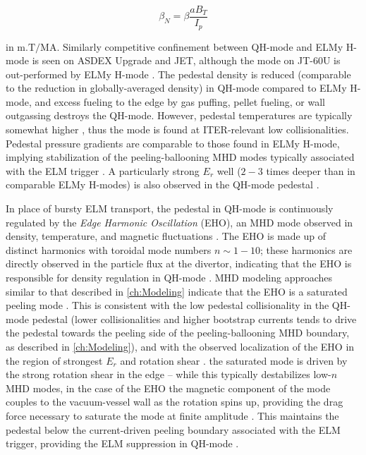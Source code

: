\begin{equation}\label{eq:betan}
 \beta_N = \beta \frac{aB_T}{I_p}
\end{equation}

\noindent in $\si{\meter.\tesla\per\mega\ampere}$.  Similarly competitive confinement between QH-mode and ELMy H-mode is seen on ASDEX Upgrade and JET, although the mode on JT-60U is out-performed by ELMy H-mode \cite{Oyama2006}.  The pedestal density is reduced (comparable to the reduction in globally-averaged density) in QH-mode compared to ELMy H-mode, and excess fueling to the edge by gas puffing, pellet fueling, or wall outgassing destroys the QH-mode.  However, pedestal temperatures are typically somewhat higher \cite{Doyle2001}, thus the mode is found at ITER-relevant low collisionalities.  Pedestal pressure gradients are comparable to those found in ELMy H-mode, implying stabilization of the peeling-ballooning MHD modes typically associated with the ELM trigger \cite{Burrell2002}.  A particularly strong $E_r$ well ($2-3$ times deeper than in comparable ELMy H-modes) is also observed in the QH-mode pedestal \cite{Greenfield2002}.

In place of bursty ELM transport, the pedestal in QH-mode is continuously regulated by the \emph{Edge Harmonic Oscillation} (EHO), an MHD mode observed in density, temperature, and magnetic fluctuations \cite{Burrell2002}.  The EHO is made up of distinct harmonics with toroidal mode numbers $n \sim 1-10$; these harmonics are directly observed in the particle flux at the divertor, indicating that the EHO is responsible for density regulation in QH-mode \cite{Doyle2001}.  MHD modeling approaches similar to that described in \cref{ch:Modeling} indicate that the EHO is a saturated peeling mode \cite{Snyder2007,Osborne2008,Snyder2012}.  This is consistent with the low pedestal collisionality in the QH-mode pedestal (lower collisionalities and higher bootstrap currents tends to drive the pedestal towards the peeling side of the peeling-ballooning MHD boundary, as described in \cref{ch:Modeling}), and with the observed localization of the EHO in the region of strongest $E_r$ and rotation shear \cite{Burrell2001}.  
the saturated mode is driven by the strong rotation shear in the edge -- while this typically destabilizes low-$n$ MHD modes, in the case of the EHO the magnetic component of the mode couples to the vacuum-vessel wall as the rotation spins up, providing the drag force necessary to saturate the mode at finite amplitude \cite{Burrell2009}.  This maintains the pedestal below the current-driven peeling boundary associated with the ELM trigger, providing the ELM suppression in QH-mode \cite{Snyder2012}.

